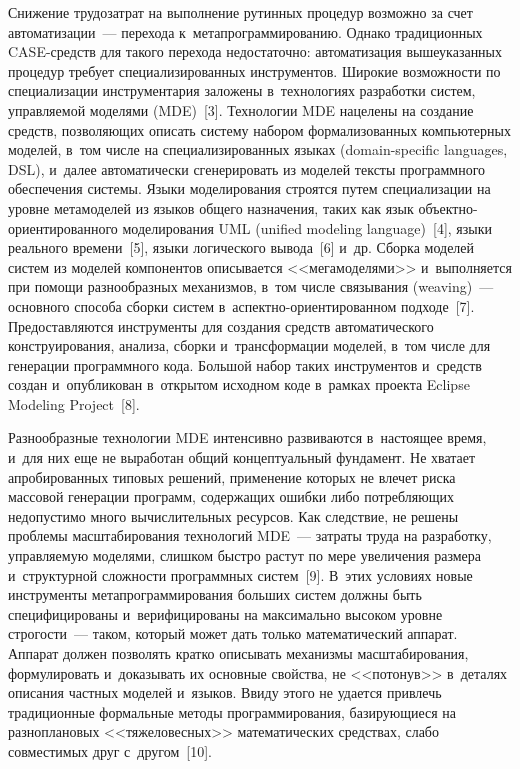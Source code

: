 \begin{multicols}{2}
   Снижение трудозатрат на выполнение рутинных процедур возможно за счет 
автоматизации~--- перехода к~метапрограммированию. Однако традиционных 
CASE-средств для такого перехода недоста\-точно: автоматизация 
вышеуказанных процедур требует специализированных инструментов. 
Широкие возможности по специализации инструментария заложены 
в~технологиях разработки сис\-тем, управляемой моделями (MDE)~[3]. 
Технологии MDE нацелены на создание средств, 
позволяющих описать систему набором формализованных компьютерных 
моделей, в~том числе на специализированных языках (domain-specific languages, 
DSL), и~далее автоматически сгенерировать из моделей тексты про\-граммно\-го 
обеспечения системы. Языки моделирования строятся путем специализации на 
уровне метамоделей из языков общего назначения, таких как язык  
объ\-ект\-но-ори\-ен\-ти\-ро\-ван\-но\-го моделирования UML
(unified modeling language)~[4], языки 
реального времени~[5], языки логического вывода~[6] и~др. Сборка моделей 
систем из моделей компонентов описывается <<мегамоделями>> 
и~выполняется при помощи разнообразных механизмов, в~том числе 
связывания (weaving)~--- основного способа сборки систем  
в~ас\-пект\-но-ори\-ен\-ти\-ро\-ван\-ном подходе~[7]. Предоставляются 
инструменты для создания средств автоматического конструирования, анализа, 
сборки и~трансформации моделей, в~том числе для генерации про\-граммно\-го 
кода. Большой набор таких инструментов и~средств создан и~опубликован 
в~открытом исходном коде в~рамках проекта Eclipse Modeling Project~[8].
   
   Разнообразные технологии MDE интенсивно развиваются в~настоящее 
время, и~для них еще не выработан общий концептуальный фундамент. Не 
хватает апробированных типовых решений, применение которых не влечет 
риска массовой генерации программ, содержащих ошибки либо по\-треб\-ля\-ющих 
недопустимо много вычислительных ресурсов. Как следствие, не решены 
проблемы масштабирования технологий MDE~--- затраты труда на разработку, 
управляемую моделями, слишком быстро растут по мере увеличения размера 
и~структурной сложности программных систем~[9]. В~этих условиях новые 
инструменты метапрограммирования больших систем должны быть 
специфицированы и~верифицированы на максимально высоком уровне 
строгости~--- таком, который может дать только математический аппарат. 
Аппарат должен позволять кратко описывать механизмы масштабирования, 
формулировать и~доказывать их основные свойства, не <<потонув>> в~деталях 
описания частных моделей и~языков. Ввиду этого не удается привлечь 
традиционные формальные методы программирования, базирующиеся на 
разноплановых <<тяжеловесных>> математических средствах, слабо 
совместимых друг с~другом~[10].
   

\end{multicols}
